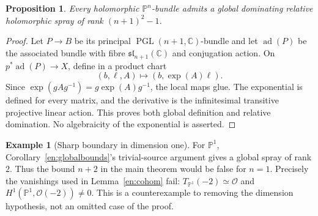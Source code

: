 \documentclass[12pt]{amsart}
\newtheorem{prop}[thm]{Proposition}
\theoremstyle{definition}
\newtheorem{eg}[thm]{Example}
\theoremstyle{remark}
\numberwithin{equation}{section}
\newcommand{\cO}{\mathcal{O}}
\newcommand{\C}{\mathbb{C}}
\newcommand{\mP}{\mathbb{P}}
\DeclareMathOperator{\PG}{PGL}
\begin{document}
\begin{prop}\label{en:relativeexistence}
Every holomorphic $\mP^n$-bundle admits a global dominating relative holomorphic spray of rank $(n+1)^2-1$.
\end{prop}
\begin{proof}
Let $P\to B$ be its principal $\PG(n+1,\C)$-bundle and let $\operatorname{ad}(P)$ be the associated bundle with fibre $\mathfrak{sl}_{n+1}(\C)$ and conjugation action. On $p^*\operatorname{ad}(P)\to X$, define in a product chart
\[
(b,\ell,A)\longmapsto (b,\exp(A)\ell).
\]
Since $\exp(gAg^{-1})=g\exp(A)g^{-1}$, the local maps glue. The exponential is defined for every matrix, and the derivative is the infinitesimal transitive projective linear action. This proves both global definition and relative domination. No algebraicity of the exponential is asserted.
\end{proof}

\begin{eg}[Sharp boundary in dimension one]\label{en:pone}
For $\mP^1$, Corollary~\ref{en:globalbounds}'s trivial-source argument gives a global spray of rank $2$. Thus the bound $n+2$ in the main theorem would be false for $n=1$. Precisely the vanishings used in Lemma~\ref{en:cohom} fail: $T_{\mP^1}(-2)\simeq\cO$ and $H^1(\mP^1,\cO(-2))\ne0$. This is a counterexample to removing the dimension hypothesis, not an omitted case of the proof.
\end{eg}
\end{document}
